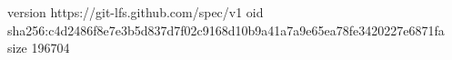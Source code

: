 version https://git-lfs.github.com/spec/v1
oid sha256:c4d2486f8e7e3b5d837d7f02c9168d10b9a41a7a9e65ea78fe3420227e6871fa
size 196704

